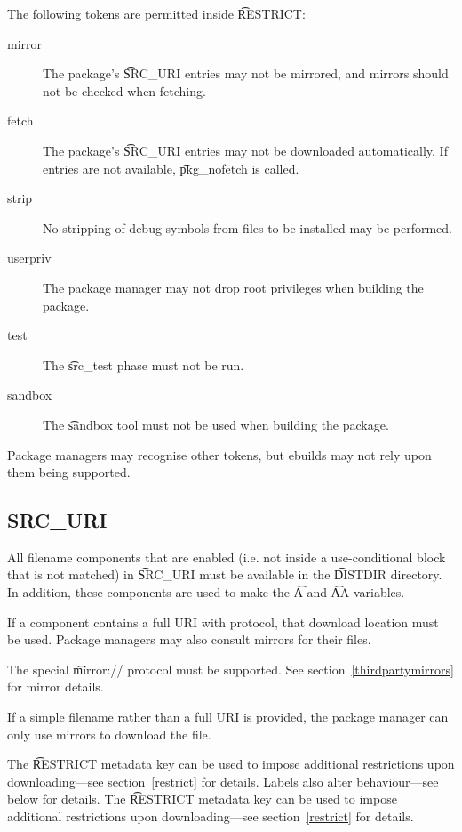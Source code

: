 The following tokens are permitted inside \t{RESTRICT}:

\begin{description}
\item[mirror] The package's \t{SRC\_URI} entries may not be mirrored, and mirrors should not
    be checked when fetching.
\item[fetch] The package's \t{SRC\_URI} entries may not be downloaded automatically. If
    entries are not available, \t{pkg\_nofetch} is called.
\item[strip] No stripping of debug symbols from files to be installed may be performed.
\item[userpriv] The package manager may not drop root privileges when building the package.
\item[test] The \t{src\_test} phase must not be run.
\item[sandbox] The \t{sandbox} tool must not be used when building the package.
\end{description}

Package managers may recognise other tokens, but ebuilds may not rely upon them being supported.

\subsection{SRC\_URI}
\label{src-uri-behaviour}

All filename components that are enabled (i.e. not inside a use-conditional block that is not
matched) in \t{SRC\_URI} must be available in the \t{DISTDIR} directory. In addition, these
components are used to make the \t{A} and \t{AA} variables.

If a component contains a full URI with protocol, that download location must be used. Package
managers may also consult mirrors for their files.

The special \t{mirror://} protocol must be supported. See section~\ref{thirdpartymirrors} for mirror
details.

If a simple filename rather than a full URI is provided, the package manager can only use mirrors to
download the file.

\IFKDEBUILDELSE
{
    The \t{RESTRICT} metadata key can be used to impose additional restrictions upon downloading---see
    section~\ref{restrict} for details. Labels also alter behaviour---see below for details.
}{
    The \t{RESTRICT} metadata key can be used to impose additional restrictions upon downloading---see
    section~\ref{restrict} for details.
}

